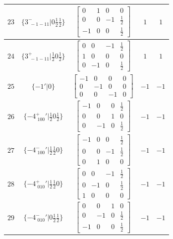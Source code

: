 \documentclass[fleqn,8pt]{jsarticle}
\begin{document}
\begin{longtable}{ccccc}
$ 23 $ & $ \{3^{-}_{\,\,-1-11}|0 \frac{1}{2} \frac{1}{2}\} $ & $ \begin{bmatrix} 0 & 1 & 0 & 0 \\ 0 & 0 & -1 & \frac{1}{2} \\ -1 & 0 & 0 & \frac{1}{2} \end{bmatrix} $ & $ 1 $ & $ 1 $ \\ \hline
$ 24 $ & $ \{3^{+}_{\,\,-1-11}|\frac{1}{2} 0 \frac{1}{2}\} $ & $ \begin{bmatrix} 0 & 0 & -1 & \frac{1}{2} \\ 1 & 0 & 0 & 0 \\ 0 & -1 & 0 & \frac{1}{2} \end{bmatrix} $ & $ 1 $ & $ 1 $ \\ \hline
$ 25 $ & $ \{-1{}'|0\} $ & $ \begin{bmatrix} -1 & 0 & 0 & 0 \\ 0 & -1 & 0 & 0 \\ 0 & 0 & -1 & 0 \end{bmatrix} $ & $ -1 $ & $ -1 $ \\ \hline
$ 26 $ & $ \{-4^{+}_{\,\,100}{}'|\frac{1}{2} 0 \frac{1}{2}\} $ & $ \begin{bmatrix} -1 & 0 & 0 & \frac{1}{2} \\ 0 & 0 & 1 & 0 \\ 0 & -1 & 0 & \frac{1}{2} \end{bmatrix} $ & $ -1 $ & $ -1 $ \\ \hline
$ 27 $ & $ \{-4^{-}_{\,\,100}{}'|\frac{1}{2} \frac{1}{2} 0\} $ & $ \begin{bmatrix} -1 & 0 & 0 & \frac{1}{2} \\ 0 & 0 & -1 & \frac{1}{2} \\ 0 & 1 & 0 & 0 \end{bmatrix} $ & $ -1 $ & $ -1 $ \\ \hline
$ 28 $ & $ \{-4^{+}_{\,\,010}{}'|\frac{1}{2} \frac{1}{2} 0\} $ & $ \begin{bmatrix} 0 & 0 & -1 & \frac{1}{2} \\ 0 & -1 & 0 & \frac{1}{2} \\ 1 & 0 & 0 & 0 \end{bmatrix} $ & $ -1 $ & $ -1 $ \\ \hline
$ 29 $ & $ \{-4^{-}_{\,\,010}{}'|0 \frac{1}{2} \frac{1}{2}\} $ & $ \begin{bmatrix} 0 & 0 & 1 & 0 \\ 0 & -1 & 0 & \frac{1}{2} \\ -1 & 0 & 0 & \frac{1}{2} \end{bmatrix} $ & $ -1 $ & $ -1 $ \\ \hline

\end{longtable}
\end{document}
